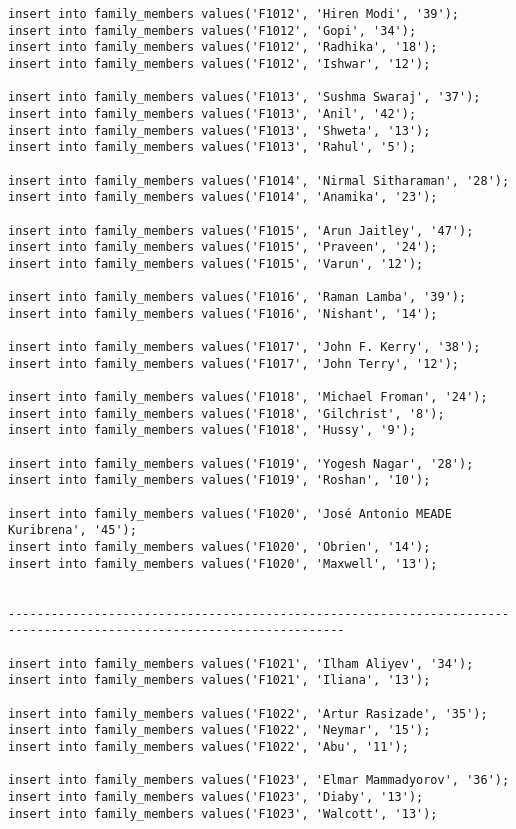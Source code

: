 \documentclass[a4,12pt]{report}
\begin{document}
\begin{lstlisting}
insert into family_members values('F1012', 'Hiren Modi', '39');
insert into family_members values('F1012', 'Gopi', '34');
insert into family_members values('F1012', 'Radhika', '18');
insert into family_members values('F1012', 'Ishwar', '12');

insert into family_members values('F1013', 'Sushma Swaraj', '37');
insert into family_members values('F1013', 'Anil', '42');
insert into family_members values('F1013', 'Shweta', '13');
insert into family_members values('F1013', 'Rahul', '5');

insert into family_members values('F1014', 'Nirmal Sitharaman', '28');
insert into family_members values('F1014', 'Anamika', '23');

insert into family_members values('F1015', 'Arun Jaitley', '47');
insert into family_members values('F1015', 'Praveen', '24');
insert into family_members values('F1015', 'Varun', '12');

insert into family_members values('F1016', 'Raman Lamba', '39');
insert into family_members values('F1016', 'Nishant', '14');

insert into family_members values('F1017', 'John F. Kerry', '38');
insert into family_members values('F1017', 'John Terry', '12');

insert into family_members values('F1018', 'Michael Froman', '24');
insert into family_members values('F1018', 'Gilchrist', '8');
insert into family_members values('F1018', 'Hussy', '9');

insert into family_members values('F1019', 'Yogesh Nagar', '28');
insert into family_members values('F1019', 'Roshan', '10');

insert into family_members values('F1020', 'José Antonio MEADE Kuribrena', '45');
insert into family_members values('F1020', 'Obrien', '14');
insert into family_members values('F1020', 'Maxwell', '13');


---------------------------------------------------------------------------------------------------------------------

insert into family_members values('F1021', 'Ilham Aliyev', '34');
insert into family_members values('F1021', 'Iliana', '13');

insert into family_members values('F1022', 'Artur Rasizade', '35');
insert into family_members values('F1022', 'Neymar', '15');
insert into family_members values('F1022', 'Abu', '11');

insert into family_members values('F1023', 'Elmar Mammadyorov', '36');
insert into family_members values('F1023', 'Diaby', '13');
insert into family_members values('F1023', 'Walcott', '13');


\end{lstlisting}
\end{document}
